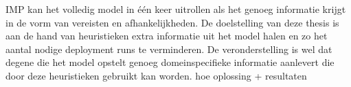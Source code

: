 IMP kan het volledig model in \'e\'en keer uitrollen als het genoeg informatie krijgt in de vorm van vereisten en afhankelijkheden.
De doelstelling van deze thesis is aan de hand van heuristieken extra informatie uit het model halen en zo het aantal nodige deployment runs te verminderen.
De veronderstelling is wel dat degene die het model opstelt genoeg domeinspecifieke informatie aanlevert die door deze heuristieken gebruikt kan worden.
 hoe oplossing + resultaten

